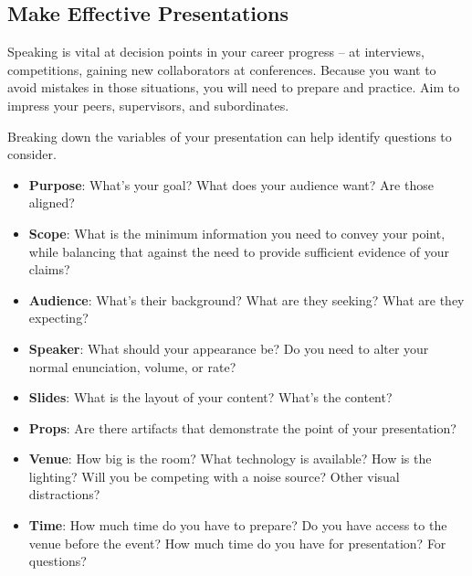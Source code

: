 \subsection*{Make Effective Presentations\label{sec:effective-presentations}}


Speaking is vital at decision points in your career progress -- at interviews, competitions, gaining new collaborators at conferences. 
Because you want to avoid mistakes in those situations, you will need to prepare and practice.
Aim to impress your peers, supervisors, and subordinates. 

Breaking down the variables of your presentation can help identify questions to consider. 
\begin{itemize}
    \item \textbf{Purpose}: What's your goal? What does your audience want? Are those aligned? 
    \item \textbf{Scope}: What is the minimum information you need to convey your point, while balancing that against the need to provide sufficient evidence of your claims?
    \item \textbf{Audience}: What's their background? What are they seeking? What are they expecting?
    \item \textbf{Speaker}: What should your appearance be? Do you need to alter your normal enunciation, volume, or rate?
    \item \textbf{Slides}: What is the layout of your content? What's the content? 
    \item \textbf{Props}: Are there artifacts that demonstrate the point of your presentation?
    \item \textbf{Venue}: How big is the room? What technology is available? How is the lighting? Will you be competing with a noise source? Other visual distractions?
    \item \textbf{Time}: How much time do you have to prepare? Do you have access to the venue before the event? How much time do you have for presentation? For questions?
\end{itemize}

